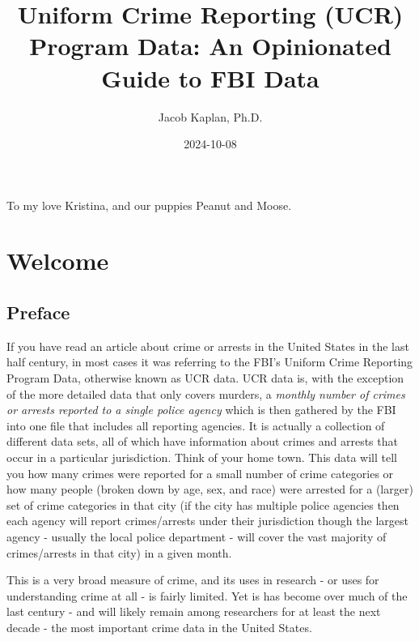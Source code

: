 \documentclass[
]{krantz}
\title{Uniform Crime Reporting (UCR) Program Data: An
Opinionated Guide to FBI Data}
\author{Jacob Kaplan, Ph.D.}
\date{2024-10-08}
\begin{document}
\maketitle

\thispagestyle{empty}
\begin{center}
To my love Kristina, and our puppies Peanut and Moose.
\end{center}

\setlength{\abovedisplayskip}{-5pt}
\setlength{\abovedisplayshortskip}{-5pt}

{
\hypersetup{linkcolor=}
\setcounter{tocdepth}{2}
\tableofcontents
}
\mainmatter

\part{Welcome}\label{part-welcome}

\chapter{Preface}\label{preface}

If you have read an article about crime or arrests in the
United States in the last half century, in most cases it was
referring to the FBI's Uniform Crime Reporting Program Data,
otherwise known as UCR data. UCR data is, with the exception
of the more detailed data that only covers murders, a
\emph{monthly number of crimes or arrests reported to a
single police agency} which is then gathered by the FBI into
one file that includes all reporting agencies. It is
actually a collection of different data sets, all of which
have information about crimes and arrests that occur in a
particular jurisdiction. Think of your home town. This data
will tell you how many crimes were reported for a small
number of crime categories or how many people (broken down
by age, sex, and race) were arrested for a (larger) set of
crime categories in that city (if the city has multiple
police agencies then each agency will report crimes/arrests
under their jurisdiction though the largest agency - usually
the local police department - will cover the vast majority
of crimes/arrests in that city) in a given month.

This is a very broad measure of crime, and its uses in
research - or uses for understanding crime at all - is
fairly limited. Yet is has become over much of the last
century - and will likely remain among researchers for at
least the next decade - the most important crime data in the
United States.
\end{document}
